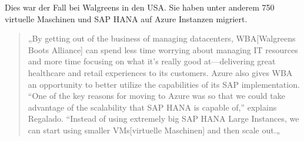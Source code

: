 
Dies war der Fall bei Walgreens in den USA.
Sie haben unter anderem 750 virtuelle Maschinen und SAP HANA auf Azure Instanzen migriert.

\begin{quote}
      „By getting out of the business of managing datacenters, WBA[Walgreens Boots Alliance] can spend less time worrying about managing IT resources and more time focusing on what it’s really good at—delivering great healthcare and retail experiences to its customers. Azure also gives WBA an opportunity to better utilize the capabilities of its SAP implementation. “One of the key reasons for moving to Azure was so that we could take advantage of the scalability that SAP HANA is capable of,” explains Regalado. “Instead of using extremely big SAP HANA Large Instances, we can start using smaller VMs[virtuelle Maschinen] and then scale out.„
          
            {\cite{AZU01}}
\end{quote}

